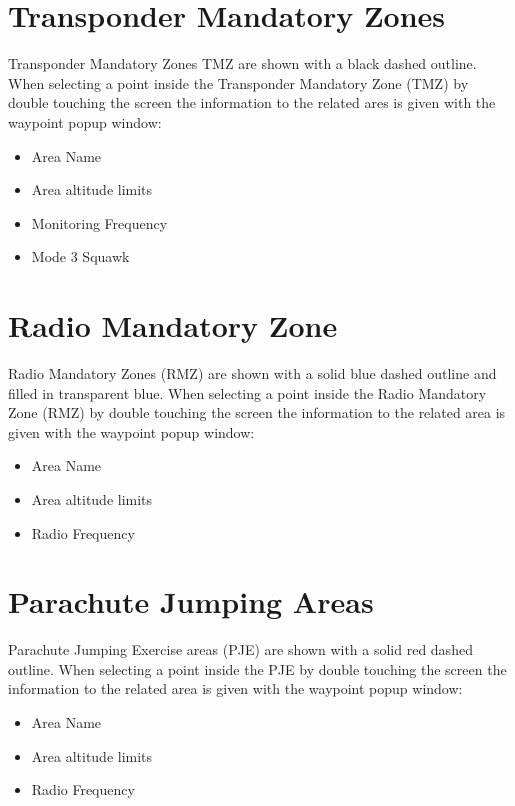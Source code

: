 \documentclass[letterpaper,10pt,english]{sphinxmanual}
\begin{document}
\section{Transponder Mandatory Zones}
\label{\detokenize{03-reference/airspace_display:transponder-mandatory-zones}}
\sphinxAtStartPar
Transponder Mandatory Zones TMZ are shown with a black dashed outline.
When selecting a point inside the Transponder Mandatory Zone (TMZ) by double touching the screen the information to the related ares is given with the waypoint pop\sphinxhyphen{}up window:
\begin{itemize}
\item {} 
\sphinxAtStartPar
Area Name

\item {} 
\sphinxAtStartPar
Area altitude limits

\item {} 
\sphinxAtStartPar
Monitoring Frequency

\item {} 
\sphinxAtStartPar
Mode 3 Squawk

\end{itemize}


\section{Radio Mandatory Zone}
\label{\detokenize{03-reference/airspace_display:radio-mandatory-zone}}
\sphinxAtStartPar
Radio Mandatory Zones (RMZ) are shown with a solid blue dashed outline and filled in transparent blue.
When selecting a point inside the Radio Mandatory Zone (RMZ) by double touching the screen the information to the related area is given with the waypoint pop\sphinxhyphen{}up window:
\begin{itemize}
\item {} 
\sphinxAtStartPar
Area Name

\item {} 
\sphinxAtStartPar
Area altitude limits

\item {} 
\sphinxAtStartPar
Radio Frequency

\end{itemize}


\section{Parachute Jumping Areas}
\label{\detokenize{03-reference/airspace_display:parachute-jumping-areas}}
\sphinxAtStartPar
Parachute Jumping Exercise areas (PJE) are shown with a solid red dashed outline.
When selecting a point inside the PJE by double touching the screen the information to the related area is given with the waypoint pop\sphinxhyphen{}up window:
\begin{itemize}
\item {} 
\sphinxAtStartPar
Area Name

\item {} 
\sphinxAtStartPar
Area altitude limits

\item {} 
\sphinxAtStartPar
Radio Frequency

\end{itemize}
\end{document}
